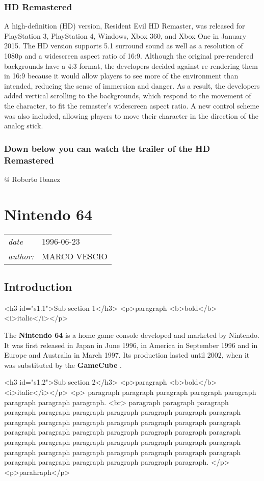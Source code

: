 \documentclass[a4paper,10pt]{book}
\newcommand{\pageHeader}[4]{
    \section{#1}
    \vspace{-0.3cm}
    \begin{table}[h!]
     \begin{tabular}{ll}
        \hline
        \textit{date} & #2 \\
        \textit{author: } & #3\\
        \hline
     \end{tabular}
    \end{table}
    \vspace{-0.3cm}
}
\begin{document}
 \subsubsection{HD Remastered }
 
            A high-definition (HD) version, Resident Evil HD Remaster, was released for PlayStation 3, PlayStation 4, Windows, Xbox 360, and Xbox One in January 2015. 
            The HD version supports 5.1 surround sound as well as a resolution of 1080p and a widescreen aspect ratio of 16:9. 
            Although the original pre-rendered backgrounds have a 4:3 format, the developers decided against re-rendering them in 16:9 because it would allow players to see more of the environment than intended, reducing the sense of immersion and danger. 
            As a result, the developers added vertical scrolling to the backgrounds, which respond to the movement of the character, to fit the remaster's widescreen aspect ratio. 
            A new control scheme was also included, allowing players to move their character in the direction of the analog stick.
         
 \subsubsection{ Down below you can watch the trailer of the HD Remastered }
 
 
 
 @ Roberto Ibanez 
 
 \newpage\pageHeader{Nintendo 64}{1996-06-23}{MARCO VESCIO}{A webpage on Nintendo 64}
 \subsection{Introduction }
 <h3 id="s1.1">Sub section 1</h3>
        <p>paragraph <b>bold</b> <i>italic</i></p> 
 
          The  \textbf{Nintendo 64 }  is a home game console developed and marketed by Nintendo. 
          It was first released in Japan in June 1996, in America in September 1996 and in Europe
          and Australia in March 1997. Its production lasted until 2002, when it was substituted by the  \textbf{GameCube } .
         
 <h3 id="s1.2">Sub section 2</h3>
        <p>paragraph <b>bold</b> <i>italic</i></p>
        <p>
          paragraph paragraph paragraph paragraph paragraph paragraph paragraph paragraph. <br>
          paragraph paragraph paragraph paragraph paragraph paragraph paragraph paragraph paragraph paragraph paragraph paragraph paragraph paragraph paragraph paragraph paragraph paragraph paragraph paragraph paragraph paragraph paragraph paragraph paragraph paragraph paragraph paragraph paragraph paragraph paragraph paragraph paragraph paragraph paragraph paragraph paragraph paragraph paragraph paragraph paragraph paragraph paragraph paragraph.
        </p>
        <p>parahraph</p> 
\end{document}
